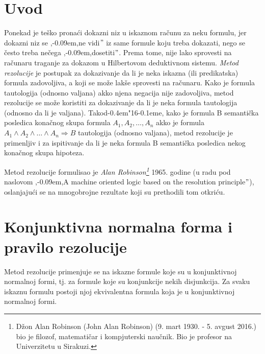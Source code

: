 \documentclass[12pt, a4paper, titlepage, twoside]{article}
\theoremstyle{definition}
\def\dj{d\kern-0.4em\char"16\kern-0.1em}
\def\zn{,\kern-0.09em,}
\begin{document}
\section{Uvod}
\vspace{1cm} \hspace{0.5cm}
Ponekad je te\v sko prona\'ci dokazni niz u iskaznom ra\v cunu za neku formulu, 
jer dokazni niz se \zn ne vidi$"$ iz same formule koju treba
dokazati, nego se \v cesto treba ne\v cega \zn dosetiti$"$. Prema tome, nije lako sprovesti
na ra\v cunaru traganje za dokazom u Hilbertovom deduktivnom
sistemu. \emph{Metod rezolucije} je postupak za dokazivanje da li je neka iskazna
(ili predikatska) formula zadovoljiva, a koji se mo\v ze lak\v se sprovesti na
ra\v cunaru. Kako je formula tautologija (odnosno valjana) akko njena negacija
nije zadovoljiva, metod rezolucije se mo\v ze koristiti za dokazivanje da li je neka
formula tautologija (odnosno da li je valjana). Tako\dj{}e, kako je formula B
semanti\v cka posledica kona\v cnog skupa formula {$A_1, A_2, \dots , A_n$} akko je formula 
$A_1 \land A_2 \land \dots \land A_n \Rightarrow B$ 
tautologija (odnosno valjana), metod rezolucije
je primenljiv i za ispitivanje da li je neka formula B semanti\v cka posledica
nekog kona\v cnog skupa hipoteza.


Metod rezolucije formulisao je \emph{Alan Robinson\footnote{D\v zon Alan Robinson 
(John Alan Robinson) (9. mart 1930. - 5. avgust 2016.) bio je filozof, matemati\v car 
i kompjuterski nau\v cnik. Bio je profesor na Univerzitetu u Sirakuzi. }} 1965. godine (u radu
pod naslovom \zn A machine oriented logic based on the resolution principle$"$), oslanjaju\'ci se na 
mnogobrojne rezultate koji su prethodili tom otkri\'cu. 

\newpage
\section{Konjunktivna normalna forma i pravilo rezolucije}
\vspace{1cm}\hspace{0.5cm}
Metod rezolucije primenjuje se na iskazne formule koje su u konjunktivnoj
normalnoj formi, tj. za formule koje su konjunkcije nekih disjunkcija. Za svaku iskaznu 
formulu postoji njoj ekvivalentna formula koja je u konjunktivnoj normalnoj formi. 
\end{document}
